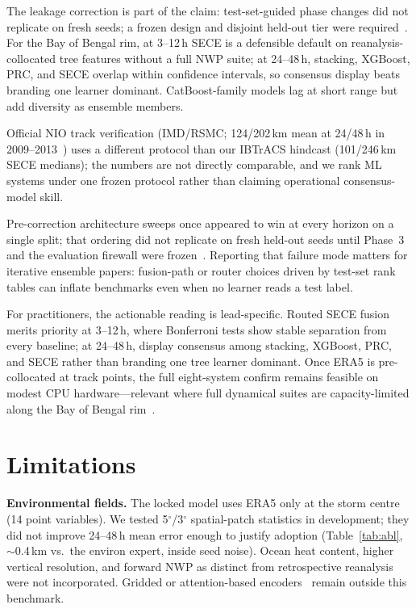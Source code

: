 \documentclass[conference]{IEEEtran}
\newcommand{\sece}{SECE}
\newcommand{\bob}{Bay of Bengal}
\newcommand{\era}{ERA5}
\begin{document}
The leakage correction is part of the claim: test-set-guided phase changes did not
replicate on fresh seeds; a frozen design and disjoint held-out tier were
required~\cite{cawley2010}. For the \bob{} rim, at 3--12\,h \sece{} is a defensible default on
reanalysis-collocated tree features without a full NWP suite; at 24--48\,h,
stacking, XGBoost, PRC, and \sece{} overlap within confidence intervals, so
consensus display beats branding one learner dominant. CatBoost-family models
lag at short range but add diversity as ensemble members.

Official NIO track verification (IMD/RSMC; 124/202\,km mean at 24/48\,h in
2009--2013~\cite{mohapatra2013imdtrack}) uses a different protocol than our
IBTrACS hindcast (101/246\,km \sece{} medians); the numbers are not directly
comparable, and we rank ML systems under one frozen protocol rather than claiming
operational consensus-model skill.

Pre-correction architecture sweeps once appeared to win at every horizon on a
single split; that ordering did not replicate on fresh held-out seeds until Phase~3
and the evaluation firewall were frozen~\cite{cawley2010}. Reporting that failure
mode matters for iterative ensemble papers: fusion-path or router choices driven by
test-set rank tables can inflate benchmarks even when no learner reads a test label.

For practitioners, the actionable reading is lead-specific. Routed \sece{} fusion
merits priority at 3--12\,h, where Bonferroni tests show stable separation from
every baseline; at 24--48\,h, display consensus among stacking, XGBoost, PRC, and
\sece{} rather than branding one tree learner dominant. Once \era{} is
pre-collocated at track points, the full eight-system confirm remains feasible on
modest CPU hardware---relevant where full dynamical suites are capacity-limited
along the \bob{} rim~\cite{kumar2024machine,dube2009storm}.

\section{Limitations}
\textbf{Environmental fields.} The locked model uses \era{} only at the storm
centre (14 point variables). We tested 5$^\circ$/3$^\circ$ spatial-patch
statistics in development; they did not improve 24--48\,h mean error enough to
justify adoption (Table~\ref{tab:abl}, ${\sim}$0.4\,km vs.\ the environ expert,
inside seed noise). Ocean heat content, higher vertical resolution, and forward NWP
as distinct from retrospective reanalysis were not incorporated. Gridded or
attention-based encoders~\cite{giffard2020tropical,qu2025accurate,vaswani2017attention} remain outside this benchmark.
\end{document}
